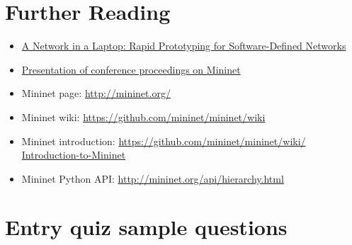 \documentclass[a4paper]{article}
\begin{document}




\section{Further Reading}

\begin{itemize}
    \item \href{https://qosip.tmit.bme.hu/foswiki/pub/Meres/OpenFlowMScMeresiSegedlet/a19-lantz.pdf}{A Network in a
              Laptop: Rapid Prototyping for Software-Defined Networks}
    \item

          \href{https://qosip.tmit.bme.hu/foswiki/pub/Meres/OpenFlowMScMeresiSegedlet/mininet-hotnets2010-final.pdf}{Presentation
              of conference proceedings on Mininet}
    \item	Mininet page: \url{http://mininet.org/}
    \item	Mininet wiki: \url{https://github.com/mininet/mininet/wiki}
    \item	Mininet introduction: \url{https://github.com/mininet/mininet/wiki/  Introduction-to-Mininet}
    \item	Mininet Python API: \url{http://mininet.org/api/hierarchy.html}
\end{itemize}

\appendix

\section{Entry quiz sample questions}

\end{document}
